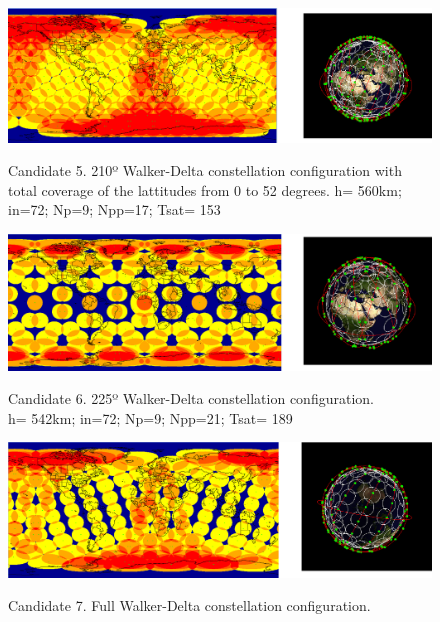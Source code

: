 \begin{figure}%
	\centering
	\includegraphics[width=1\textwidth]{Candidate5.png}\\
	\caption{Candidate 5. 210º Walker-Delta constellation configuration with total coverage of the lattitudes from 0 to 52 degrees.
			 h= 560km; in=72; Np=9; Npp=17; Tsat= 153} 
	\label{fig:Candidate5}
\end{figure}

\begin{figure}%
	\centering
	\includegraphics[width=1\textwidth]{Candidate6.png}\\
	\caption{Candidate 6. 225º Walker-Delta constellation configuration.\\
			 h= 542km; in=72; Np=9; Npp=21; Tsat= 189}
	\label{fig:Candidate6}
\end{figure}

\begin{figure}%
	\centering
	\includegraphics[width=1\textwidth]{Candidate7.png}\\
	\caption{Candidate 7. Full Walker-Delta constellation configuration.}
	\label{fig:Candidate7}
\end{figure}


